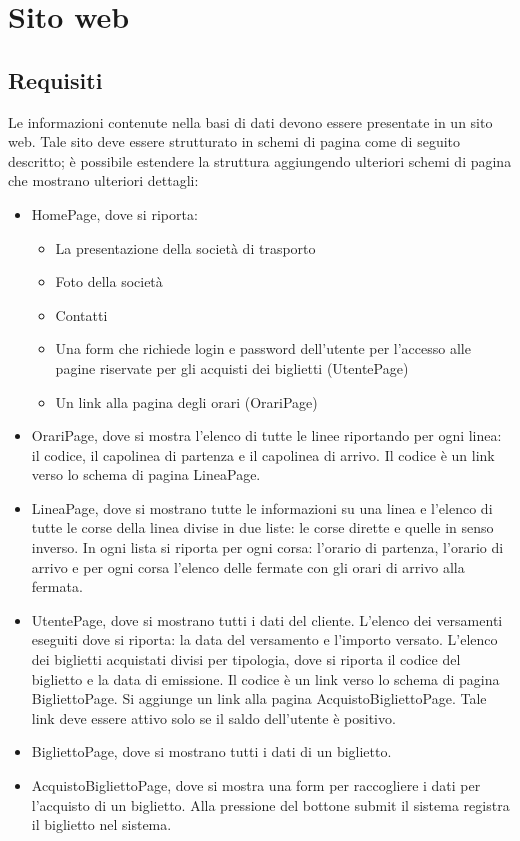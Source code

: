 \documentclass[a4paper,11pt]{book}
\begin{document}
\chapter{Sito web}
\section{Requisiti}
Le informazioni contenute nella basi di dati devono essere presentate in un sito web. Tale sito deve essere strutturato in schemi di pagina come di seguito descritto; è possibile estendere la struttura aggiungendo ulteriori schemi di pagina che mostrano ulteriori dettagli:
\begin{itemize}
\item HomePage, dove si riporta:
	\begin{itemize}
	\item La presentazione della società di trasporto
	\item Foto della società
	\item Contatti
	\item Una form che richiede login e password dell'utente per l'accesso alle pagine riservate per gli acquisti dei biglietti (UtentePage)
	\item Un link alla pagina degli orari (OrariPage)
	\end{itemize}
\item OrariPage, dove si mostra l'elenco di tutte le linee riportando per ogni linea: il codice, il capolinea di partenza e il capolinea di arrivo. Il codice è un link verso lo schema di pagina LineaPage.
\item LineaPage, dove si mostrano tutte le informazioni su una linea e l'elenco di tutte le corse della linea divise in due liste: le corse dirette e quelle in senso inverso. In ogni lista si riporta per ogni corsa: l'orario di partenza, l'orario di arrivo e per ogni corsa l'elenco delle fermate con gli orari di arrivo alla fermata.
\item UtentePage, dove si mostrano tutti i dati del cliente. L'elenco dei versamenti eseguiti dove si riporta: la data del versamento e l'importo versato. L'elenco dei biglietti acquistati divisi per tipologia, dove si riporta il codice del biglietto e la data di emissione. Il codice è un link verso lo schema di pagina BigliettoPage. Si aggiunge un link alla pagina AcquistoBigliettoPage. Tale link deve essere attivo solo se il saldo dell'utente è positivo.
\item BigliettoPage, dove si mostrano tutti i dati di un biglietto.
\item AcquistoBigliettoPage, dove si mostra una form per raccogliere i dati per l'acquisto di un biglietto. Alla pressione del bottone submit il sistema registra il biglietto nel sistema.
\end{itemize}
\end{document}
